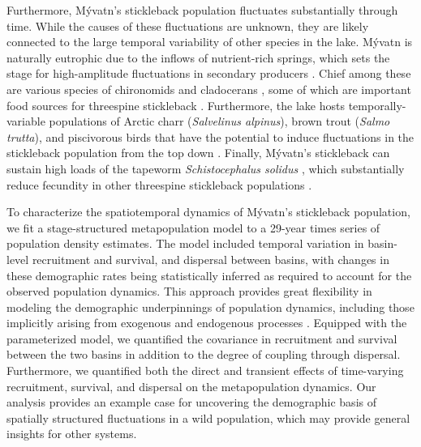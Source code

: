 \documentclass[11pt]{article}
\begin{document}
Furthermore, M\'{y}vatn's stickleback population fluctuates substantially through time.
While the causes of these fluctuations are unknown,
they are likely connected to the large temporal variability
of other species in the lake.
M\'{y}vatn is naturally eutrophic due to the inflows of nutrient-rich springs,
which sets the stage for high-amplitude fluctuations in secondary producers
\citep{einarsson2004myvatn}.
Chief among these are various species of chironomids and cladocerans
\citep{einarsson2002, einarsson2004clad, gardarsson2004population, ives2008},
some of which are important food sources for threespine stickleback
\citep{gudmundsson1996}.
Furthermore, the lake hosts temporally-variable populations
of Arctic charr (\textit{Salvelinus alpinus}),
brown trout (\textit{Salmo trutta}),
and piscivorous birds that have the potential
to induce fluctuations in the stickleback population from the top down
\citep{gardarsson1979waterfowl, gudbergsson2004}.
Finally, M\'{y}vatn's stickleback can sustain high loads of the tapeworm
\textit{Schistocephalus solidus} \citep{gislason1998, karvonen2013},
which substantially reduce fecundity
in other threespine stickleback populations
\citep{heins2010evolutionary, heins2012fecundity}.

To characterize the spatiotemporal dynamics of M\'{y}vatn's stickleback population,
we fit a stage-structured metapopulation model \citep{caswell2001matrix}
to a 29-year times series of population density estimates.
The model included temporal variation in basin-level recruitment and survival,
and dispersal between basins,
with changes in these demographic rates being statistically inferred
as required to account for the observed population dynamics.
This approach provides great flexibility in modeling the demographic underpinnings of
population dynamics,
including those implicitly arising from exogenous and endogenous processes
\citep{zeng1998, ives2012}.
Equipped with the parameterized model,
we quantified the covariance in recruitment and survival between the two basins
in addition to the degree of coupling through dispersal.
Furthermore, we quantified both the direct and transient effects of
time-varying recruitment, survival, and dispersal
on the metapopulation dynamics.
Our analysis provides an example case for uncovering the demographic basis
of spatially structured fluctuations in a wild population,
which may provide general insights for other systems.




\end{document}
